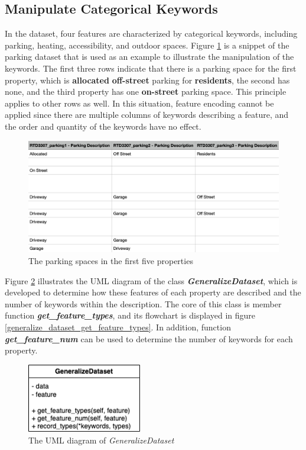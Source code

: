 \documentclass[12pt,twoside]{report}
\begin{document}
\subsection{Manipulate Categorical Keywords}
In the dataset, four features are characterized by categorical keywords, including parking, heating, accessibility, and outdoor spaces. Figure \ref{parking_dataset} is a snippet of the parking dataset that is used as an example to illustrate the manipulation of the keywords. The first three rows indicate that there is a parking space for the first property, which is \textbf{allocated} \textbf{off-street} parking for \textbf{residents}, the second has none, and the third property has one \textbf{on-street} parking space. This principle applies to other rows as well. In this situation, feature encoding cannot be applied since there are multiple columns of keywords describing a feature, and the order and quantity of the keywords have no effect.

\begin{figure}[!htbp]
	\centering
	\includegraphics[width=12cm]{parking_dataset}
	\caption{The parking spaces in the first five properties}
	\label{parking_dataset}
\end{figure}

Figure \ref{uml_generalize_dataset} illustrates the UML diagram of the class \textit{\textbf{GeneralizeDataset}}, which is developed to determine how these features of each property are described and the number of keywords within the description. The core of this class is member function \textit{\textbf{get\_feature\_types}}, and its flowchart is displayed in figure \ref{generalize_dataset_get_feature_types}. In addition, function \textbf{\textit{get\_feature\_num}} can be used to determine the number of keywords for each property. 
\begin{figure}[!htbp]
	\centering
	\includegraphics[width=5cm]{uml_generalize_dataset}
	\caption{The UML diagram of \textit{GeneralizeDataset}}
	\label{uml_generalize_dataset}
\end{figure}
\end{document}
